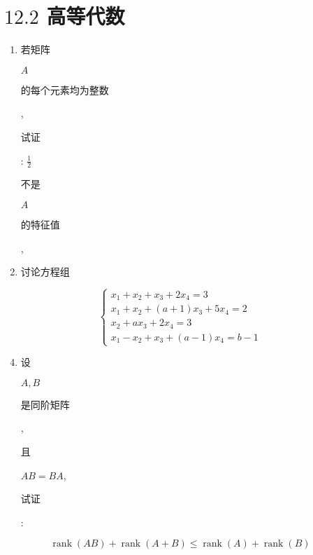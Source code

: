 \documentclass[10pt]{article}
\begin{document}
\section{$12.2$ 高等代数}
\begin{enumerate}
  \item \begin{CJK}{UTF8}{mj}若矩阵\end{CJK} $A$ \begin{CJK}{UTF8}{mj}的每个元素均为整数\end{CJK}, \begin{CJK}{UTF8}{mj}试证\end{CJK}: $\frac{1}{2}$ \begin{CJK}{UTF8}{mj}不是\end{CJK} $A$ \begin{CJK}{UTF8}{mj}的特征值\end{CJK},

  \item \begin{CJK}{UTF8}{mj}讨论方程组\end{CJK}

\end{enumerate}
$$
\left\{\begin{array}{l}
x_{1}+x_{2}+x_{3}+2 x_{4}=3 \\
x_{1}+x_{2}+(a+1) x_{3}+5 x_{4}=2 \\
x_{2}+a x_{3}+2 x_{4}=3 \\
x_{1}-x_{2}+x_{3}+(a-1) x_{4}=b-1
\end{array}\right.
$$

\begin{enumerate}
  \setcounter{enumi}{3}
  \item \begin{CJK}{UTF8}{mj}设\end{CJK} $A, B$ \begin{CJK}{UTF8}{mj}是同阶矩阵\end{CJK}, \begin{CJK}{UTF8}{mj}且\end{CJK} $A B=B A$, \begin{CJK}{UTF8}{mj}试证\end{CJK}:
\end{enumerate}
$$
\operatorname{rank}(A B)+\operatorname{rank}(A+B) \leq \operatorname{rank}(A)+\operatorname{rank}(B)
$$
\end{document}
